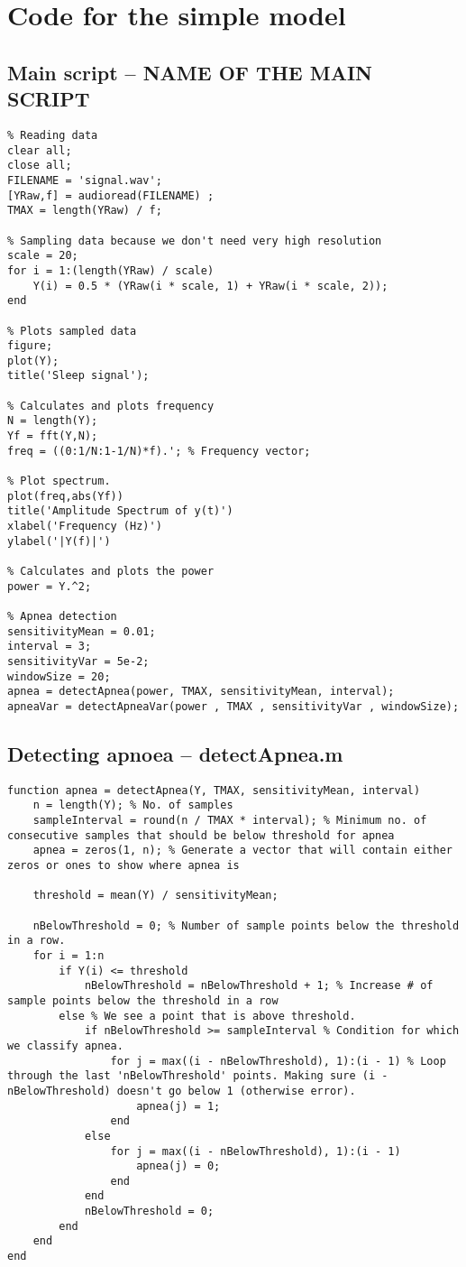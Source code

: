 \chapter{Code for the simple model}
\section{Main script -- NAME OF THE MAIN SCRIPT}
\begin{lstlisting}
% Reading data
clear all;
close all;
FILENAME = 'signal.wav';
[YRaw,f] = audioread(FILENAME) ;
TMAX = length(YRaw) / f;

% Sampling data because we don't need very high resolution
scale = 20;
for i = 1:(length(YRaw) / scale)
    Y(i) = 0.5 * (YRaw(i * scale, 1) + YRaw(i * scale, 2));
end

% Plots sampled data
figure;
plot(Y);
title('Sleep signal');

% Calculates and plots frequency
N = length(Y);
Yf = fft(Y,N);
freq = ((0:1/N:1-1/N)*f).'; % Frequency vector;

% Plot spectrum.
plot(freq,abs(Yf)) 
title('Amplitude Spectrum of y(t)')
xlabel('Frequency (Hz)')
ylabel('|Y(f)|')

% Calculates and plots the power
power = Y.^2;

% Apnea detection
sensitivityMean = 0.01;
interval = 3;
sensitivityVar = 5e-2;
windowSize = 20;
apnea = detectApnea(power, TMAX, sensitivityMean, interval);
apneaVar = detectApneaVar(power , TMAX , sensitivityVar , windowSize);
\end{lstlisting}

\section{Detecting apnoea -- detectApnea.m}
\label{sec:detectApnea}
\begin{lstlisting}
function apnea = detectApnea(Y, TMAX, sensitivityMean, interval)
    n = length(Y); % No. of samples
    sampleInterval = round(n / TMAX * interval); % Minimum no. of consecutive samples that should be below threshold for apnea
    apnea = zeros(1, n); % Generate a vector that will contain either zeros or ones to show where apnea is
    
    threshold = mean(Y) / sensitivityMean;
    
    nBelowThreshold = 0; % Number of sample points below the threshold in a row.
	for i = 1:n
        if Y(i) <= threshold
            nBelowThreshold = nBelowThreshold + 1; % Increase # of sample points below the threshold in a row
        else % We see a point that is above threshold.
            if nBelowThreshold >= sampleInterval % Condition for which we classify apnea.
                for j = max((i - nBelowThreshold), 1):(i - 1) % Loop through the last 'nBelowThreshold' points. Making sure (i - nBelowThreshold) doesn't go below 1 (otherwise error).
                    apnea(j) = 1;
                end
            else
                for j = max((i - nBelowThreshold), 1):(i - 1)
                    apnea(j) = 0;
                end
            end
            nBelowThreshold = 0;
        end
    end
end
\end{lstlisting}

